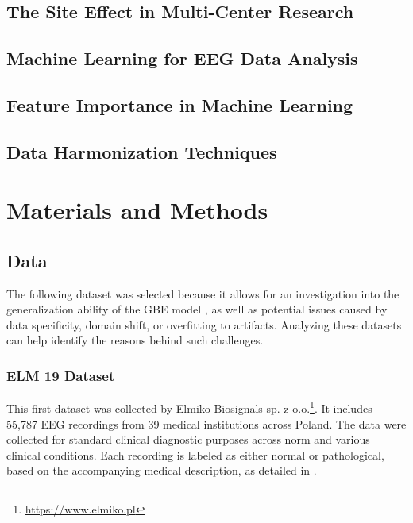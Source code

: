 \documentclass{bachelor2025eng}
\begin{document}
    \section{The Site Effect in Multi-Center Research}
        
    \section{Machine Learning for EEG Data Analysis}

    \section{Feature Importance in Machine Learning}

    \section{Data Harmonization Techniques}

\chapter{Materials and Methods}
\label{chap:methods}
    \section{Data}
        The following dataset was selected because it allows for an investigation into the generalization ability of the GBE model \cite{Poziomska2024}, as well as potential issues caused by data specificity, domain shift, or overfitting to artifacts. Analyzing these datasets can help identify the reasons behind such challenges.

        \subsection{ELM 19 Dataset}
        This first dataset was collected by Elmiko Biosignals sp. z o.o.\footnote{\url{https://www.elmiko.pl}}. It includes 55,787 EEG recordings from 39 medical institutions across Poland. The data were collected for standard clinical diagnostic purposes across norm and various 
        clinical
        conditions. Each recording is labeled as either normal or pathological, based on the accompanying medical description, as detailed in \cite{Poziomska2024}.
\end{document}
